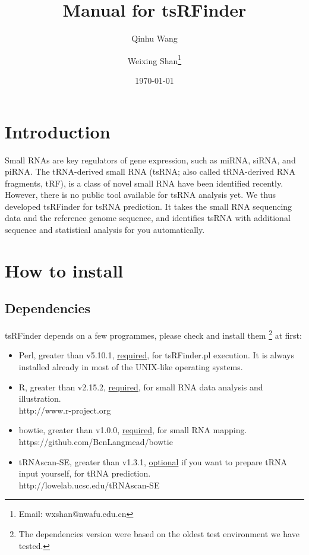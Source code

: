 \documentclass[11pt, a4paper]{article}
\title{Manual for tsRFinder}
\author{Qinhu Wang}
\author{Weixing Shan\thanks{Email: wxshan@nwafu.edu.cn}}
\affil{Northwest A\&F University}
\date{\today}
\begin{document}
\maketitle
\tableofcontents

\section{Introduction}

Small RNAs are key regulators of gene expression, such as miRNA, siRNA, and piRNA. The tRNA-derived small RNA (tsRNA; also called tRNA-derived RNA fragments, tRF), is a class of novel small RNA have been identified recently. However, there is no public tool available for tsRNA analysis yet. We thus developed tsRFinder for tsRNA prediction. It takes the small RNA sequencing data and the reference genome sequence, and identifies tsRNA with additional sequence and statistical analysis for you automatically.

\section{How to install}

\subsection{Dependencies}

tsRFinder depends on a few programmes, please check and install them \footnote{The dependencies version were based on the oldest test environment we have tested.} at first:

\begin{itemize}

\item Perl, greater than v5.10.1, \underline{required}, for tsRFinder.pl execution. It is always installed already in most of the UNIX-like operating systems.
\item R, greater than v2.15.2, \underline{required}, for small RNA data analysis and illustration. \\http://www.r-project.org
\item bowtie, greater than v1.0.0, \underline{required}, for small RNA mapping. \\https://github.com/BenLangmead/bowtie
\item tRNAscan-SE, greater than v1.3.1, \underline{optional} if you want to prepare tRNA input yourself, for tRNA prediction. \\http://lowelab.ucsc.edu/tRNAscan-SE

\end{itemize}
\end{document}
